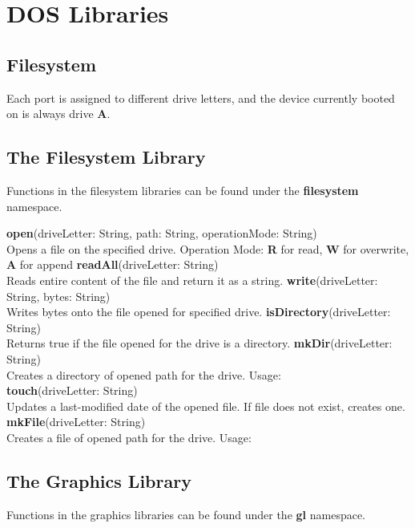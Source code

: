 \chapter{DOS Libraries}

\section{Filesystem}

Each port is assigned to different drive letters, and the device currently booted on is always drive \textbf{A}.

\section{The Filesystem Library}

Functions in the filesystem libraries can be found under the \textbf{filesystem} namespace.

\begin{outline}
\1\textbf{open}(driveLetter: String, path: String, operationMode: String)
\\Opens a file on the specified drive.
 \2Operation Mode: \textbf{R} for read, \textbf{W} for overwrite, \textbf{A} for append
\1\textbf{readAll}(driveLetter: String)
\\Reads entire content of the file and return it as a string.
\1\textbf{write}(driveLetter: String, bytes: String)
\\Writes bytes onto the file opened for specified drive.
\1\textbf{isDirectory}(driveLetter: String)
\\Returns true if the file opened for the drive is a directory.
\1\textbf{mkDir}(driveLetter: String)
\\Creates a directory of opened path for the drive. Usage:
\\
\1\textbf{touch}(driveLetter: String)
\\Updates a last-modified date of the opened file. If file does not exist, creates one.
\1\textbf{mkFile}(driveLetter: String)
\\Creates a file of opened path for the drive. Usage:
\\
\end{outline}


\section{The Graphics Library}

Functions in the graphics libraries can be found under the \textbf{gl} namespace.
